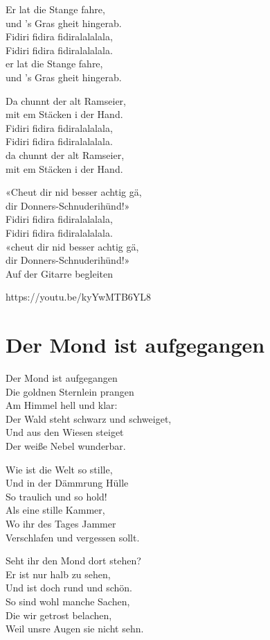 \documentclass[
  letterpaper,
]{scrbook}
\begin{document}
Er lat die Stange fahre,\\
und 's Gras gheit hingerab.\\
Fidiri fidira fidiralalalala,\\
Fidiri fidira fidiralalalala.\\
er lat die Stange fahre,\\
und 's Gras gheit hingerab.

Da chunnt der alt Ramseier,\\
mit em Stäcken i der Hand.\\
Fidiri fidira fidiralalalala,\\
Fidiri fidira fidiralalalala.\\
da chunnt der alt Ramseier,\\
mit em Stäcken i der Hand.

«Cheut dir nid besser achtig gä,\\
dir Donners-Schnuderihünd!»\\
Fidiri fidira fidiralalalala,\\
Fidiri fidira fidiralalalala.\\
«cheut dir nid besser achtig gä,\\
dir Donners-Schnuderihünd!»\\
Auf der Gitarre begleiten

https://youtu.be/kyYwMTB6YL8

\hypertarget{der-mond-ist-aufgegangen}{%
\chapter{Der Mond ist aufgegangen}\label{der-mond-ist-aufgegangen}}

Der Mond ist aufgegangen\\
Die goldnen Sternlein prangen\\
Am Himmel hell und klar:\\
Der Wald steht schwarz und schweiget,\\
Und aus den Wiesen steiget\\
Der weiße Nebel wunderbar.

Wie ist die Welt so stille,\\
Und in der Dämmrung Hülle\\
So traulich und so hold!\\
Als eine stille Kammer,\\
Wo ihr des Tages Jammer\\
Verschlafen und vergessen sollt.

Seht ihr den Mond dort stehen?\\
Er ist nur halb zu sehen,\\
Und ist doch rund und schön.\\
So sind wohl manche Sachen,\\
Die wir getrost belachen,\\
Weil unsre Augen sie nicht sehn.
\end{document}

